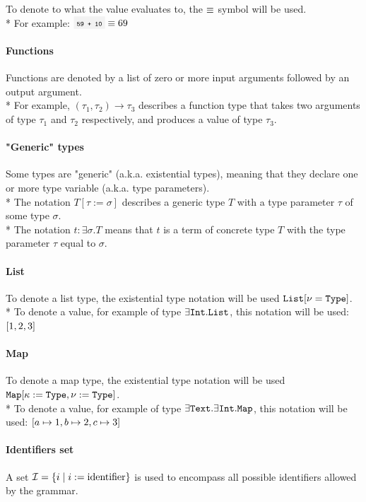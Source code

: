 To denote to what the value evaluates to, the $\equiv$ symbol will be used.\\*
For example: $\code{59 + 10} \eval 69$

\paragraph{Functions} Functions are denoted by a list of zero or more input
arguments followed by an output argument.\\*
For example, $(\tau_1,\tau_2)\to\tau_3$ describes a function type that takes
two arguments of type $\tau_1$ and $\tau_2$ respectively, and produces a value
of type $\tau_3$.

\clearpage

\paragraph{"Generic" types} Some types are "generic" (a.k.a. existential
types), meaning that they declare one or more type variable (a.k.a. type
parameters).\\*
The notation $T[\tau:=\sigma]$ describes a generic type $T$ with a type
parameter $\tau$ of some type $\sigma$.\\*
The notation $t : \exists\sigma.T$ means that $t$ is a term of concrete
type $T$ with the type parameter $\tau$ equal to $\sigma$.

\paragraph{List} To denote a list type, the existential type notation will
be used $\texttt{List}[\nu=\texttt{Type}]$.\\*
To denote a value, for example of type $\exists\texttt{Int}.\texttt{List}$, this notation will
be used: $\left[1,2,3\right]$

\paragraph{Map} To denote a map type, the existential type notation will
be used $\texttt{Map}[\kappa:=\texttt{Type},\nu:=\texttt{Type}]$.\\*
To denote a value, for example of type $\exists\texttt{Text}.\exists\texttt{Int}.\texttt{Map}$, this
notation will be used: $\left[a\mapsto1,b\mapsto2,c\mapsto3\right]$

\paragraph{Identifiers set} A set $\mathcal{I}=\left\{i\mid i:=\text{identifier}\right\}$ is
used to encompass all possible identifiers allowed by the grammar.

